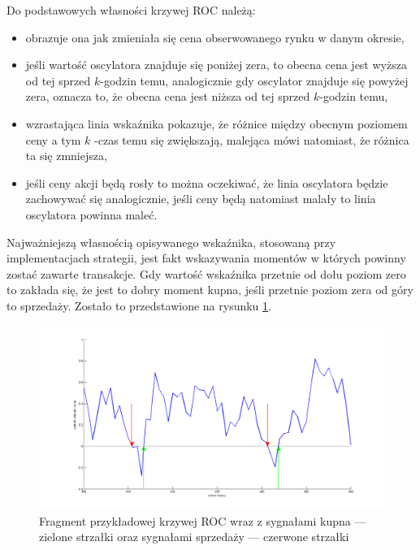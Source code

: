 \noindent Do podstawowych własności krzywej ROC należą:
\begin{itemize}
\item obrazuje ona jak zmieniała się cena obserwowanego rynku w danym okresie,
\item jeśli wartość oscylatora znajduje się poniżej zera, to obecna cena jest wyższa od tej sprzed $k$-godzin temu, analogicznie gdy oscylator znajduje się powyżej zera, oznacza to, że obecna cena jest niższa od tej sprzed $k$-godzin temu,
\item wzrastająca linia wskaźnika pokazuje, że różnice między
obecnym poziomem ceny a tym $k$ -czas temu się
zwiększają, malejąca mówi natomiast, że różnica ta się zmniejsza,
\item jeśli ceny akcji będą rosły to można oczekiwać, że linia
oscylatora będzie zachowywać się analogicznie, jeśli ceny będą natomiast malały to linia oscylatora powinna maleć.
\end{itemize}
Najważniejszą własnością opisywanego wskaźnika, stosowaną przy implementacjach strategii, jest fakt wskazywania momentów w których powinny zostać zawarte transakcje. Gdy wartość wskaźnika przetnie od dołu poziom zero to zakłada się, że jest to dobry moment kupna, jeśli przetnie poziom zera od góry to sprzedaży. Zostało to przedstawione na rysunku \ref{kupsprz}. \\
\begin{figure}[h!]
\centering
\includegraphics[width = \textwidth]{BuySell.png}
\caption{Fragment przykładowej krzywej ROC wraz z sygnałami kupna --- zielone strzałki oraz sygnałami sprzedaży --- czerwone strzałki}
\label{kupsprz}
\end{figure}
\FloatBarrier

